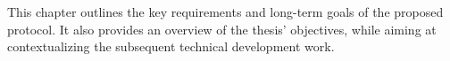 This chapter outlines the key requirements and long-term goals of the proposed \pol{} protocol. It also provides an overview of the thesis' objectives, while aiming at contextualizing the subsequent technical development work.